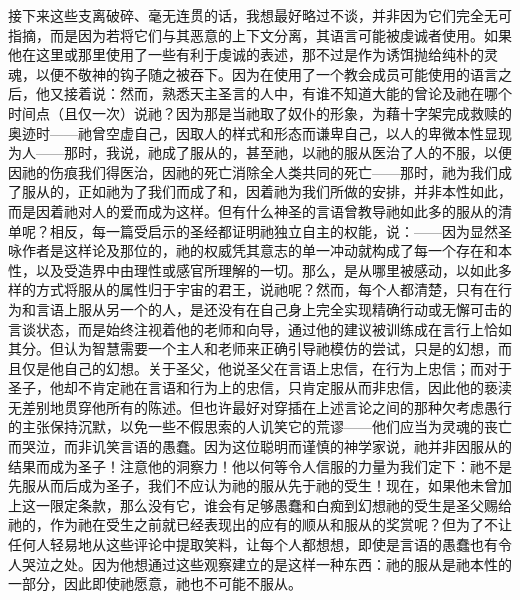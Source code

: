 接下来这些支离破碎、毫无连贯的话，我想最好略过不谈，并非因为它们完全无可指摘，而是因为若将它们与其恶意的上下文分离，其语言可能被虔诚者使用。如果他在这里或那里使用了一些有利于虔诚的表述，那不过是作为诱饵抛给纯朴的灵魂，以便不敬神的钩子随之被吞下。因为在使用了一个教会成员可能使用的语言之后，他又接着说：然而，熟悉天主圣言的人中，有谁不知道大能的曾论及祂在哪个时间点（且仅一次）说祂？因为那是当祂取了奴仆的形象，为藉十字架完成救赎的奥迹时——祂曾空虚自己，因取人的样式和形态而谦卑自己，以人的卑微本性显现为人——那时，我说，祂成了服从的，甚至祂，以祂的服从医治了人的不服，以便因祂的伤痕我们得医治，因祂的死亡消除全人类共同的死亡——那时，祂为我们成了服从的，正如祂为了我们而成了和，因着祂为我们所做的安排，并非本性如此，而是因着祂对人的爱而成为这样。但有什么神圣的言语曾教导祂如此多的服从的清单呢？相反，每一篇受启示的圣经都证明祂独立自主的权能，说：——因为显然圣咏作者是这样论及那位的，祂的权威凭其意志的单一冲动就构成了每一个存在和本性，以及受造界中由理性或感官所理解的一切。那么，是从哪里被感动，以如此多样的方式将服从的属性归于宇宙的君王，说祂呢？然而，每个人都清楚，只有在行为和言语上服从另一个的人，是还没有在自己身上完全实现精确行动或无懈可击的言谈状态，而是始终注视着他的老师和向导，通过他的建议被训练成在言行上恰如其分。但认为智慧需要一个主人和老师来正确引导祂模仿的尝试，只是的幻想，而且仅是他自己的幻想。关于圣父，他说圣父在言语上忠信，在行为上忠信；而对于圣子，他却不肯定祂在言语和行为上的忠信，只肯定服从而非忠信，因此他的亵渎无差别地贯穿他所有的陈述。但也许最好对穿插在上述言论之间的那种欠考虑愚行的主张保持沉默，以免一些不假思索的人讥笑它的荒谬——他们应当为灵魂的丧亡而哭泣，而非讥笑言语的愚蠢。因为这位聪明而谨慎的神学家说，祂并非因服从的结果而成为圣子！注意他的洞察力！他以何等令人信服的力量为我们定下：祂不是先服从而后成为圣子，我们不应认为祂的服从先于祂的受生！现在，如果他未曾加上这一限定条款，那么没有它，谁会有足够愚蠢和白痴到幻想祂的受生是圣父赐给祂的，作为祂在受生之前就已经表现出的应有的顺从和服从的奖赏呢？但为了不让任何人轻易地从这些评论中提取笑料，让每个人都想想，即使是言语的愚蠢也有令人哭泣之处。因为他想通过这些观察建立的是这样一种东西：祂的服从是祂本性的一部分，因此即使祂愿意，祂也不可能不服从。\par

